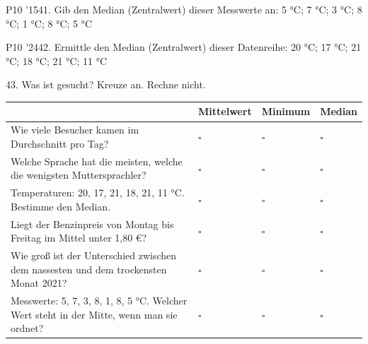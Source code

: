 \documentclass[11pt]{article}
\begin{document}
\pfgruppe{}
\begin{pfaufg}{P10 ’15}{41.}{}
Gib den Median (Zentralwert) dieser Messwerte an: 5 °C; 7 °C; 3 °C; 8 °C; 1 °C; 8 °C; 5 °C
\end{pfaufg}
\pfgruppe{}
\begin{pfaufg}{P10 ’24}{42.}{}
Ermittle den Median (Zentralwert) dieser Datenreihe: 20 °C; 17 °C; 21 °C; 18 °C; 21 °C; 11 °C
\end{pfaufg}

\par\Needspace*{0.55\textheight}
\begin{pfaufg}{}{43.}{}
Was ist gesucht? Kreuze an. Rechne nicht.
\par\smallskip\noindent \begingroup\renewcommand{\arraystretch}{1.4}\begin{tabular}{|>{\raggedright\arraybackslash}p{6.3cm}|>{\centering\arraybackslash\hyphenpenalty=0}p{1.55cm}|>{\centering\arraybackslash\hyphenpenalty=0}p{1.55cm}|>{\centering\arraybackslash\hyphenpenalty=0}p{1.55cm}|}\hline  & {\scriptsize\hspace{0pt}Mittelwert} & {\scriptsize\hspace{0pt}Minimum} & {\scriptsize\hspace{0pt}Median} \\ \hline Wie viele Besucher kamen im Durchschnitt pro Tag? & $\square$ & $\square$ & $\square$ \\ \hline Welche Sprache hat die meisten, welche die wenigsten Muttersprachler? & $\square$ & $\square$ & $\square$ \\ \hline Temperaturen: 20, 17, 21, 18, 21, 11 °C. Bestimme den Median. & $\square$ & $\square$ & $\square$ \\ \hline Liegt der Benzinpreis von Montag bis Freitag im Mittel unter 1,80 €? & $\square$ & $\square$ & $\square$ \\ \hline Wie groß ist der Unterschied zwischen dem nassesten und dem trockensten Monat 2021? & $\square$ & $\square$ & $\square$ \\ \hline Messwerte: 5, 7, 3, 8, 1, 8, 5 °C. Welcher Wert steht in der Mitte, wenn man sie ordnet? & $\square$ & $\square$ & $\square$ \\ \hline\end{tabular}\endgroup\par
\end{pfaufg}
\end{document}
